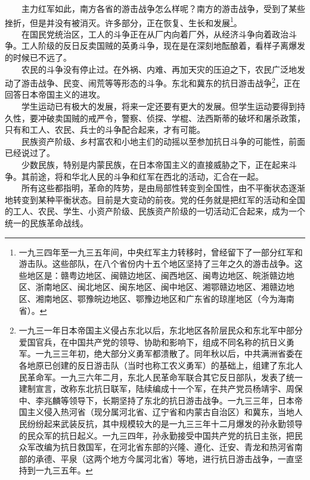 \documentclass[cn,11pt,chinese]{elegantbook}
\begin{document}
　　主力红军如此，南方各省的游击战争怎么样呢？南方的游击战争，受到了某些挫折，但是并没有被消灭。许多部分，正在恢复、生长和发展\footnote[27]{ 一九三四年至一九三五年间，中央红军主力转移时，曾经留下了一部分红军和游击队。这些部队，在八个省份内十五个地区坚持了三年之久的游击战争。这些地区是：赣粤边地区、闽赣边地区、闽西地区、闽粤边地区、皖浙赣边地区、浙南地区、闽北地区、闽东地区、闽中地区、湘鄂赣边地区、湘赣边地区、湘南地区、鄂豫皖边地区、鄂豫边地区和广东省的琼崖地区（今为海南省）。}。\\
　　在国民党统治区，工人的斗争正在从厂内向着厂外，从经济斗争向着政治斗争。工人阶级的反日反卖国贼的英勇斗争，现在是在深刻地酝酿着，看样子离爆发的时候已不远了。\\
　　农民的斗争没有停止过。在外祸、内难、再加天灾的压迫之下，农民广泛地发动了游击战争、民变、闹荒等等形态的斗争。东北和冀东的抗日游击战争\footnote[28]{ 一九三一年日本帝国主义侵占东北以后，东北地区各阶层民众和东北军中部分爱国官兵，在中国共产党的领导、协助和影响下，组成不同名称的抗日义勇军。一九三三年初，绝大部分义勇军都溃散了。同年秋以后，中共满洲省委在各地原已创建的反日游击队（当时也称工农义勇军）的基础上，组建了东北人民革命军。一九三六年二月，东北人民革命军联合其它反日部队，发表了统一建制宣言，改称东北抗日联军，陆续编成十一个军，在共产党员杨靖宇、周保中、李兆麟等领导下，长期坚持了东北的抗日游击战争。一九三三年，日本帝国主义侵入热河省（现分属河北省、辽宁省和内蒙古自治区）和冀东，当地人民纷纷起来武装反抗，其中规模较大的是一九三三年十二月爆发的孙永勤领导的民众军的抗日起义。一九三四年，孙永勤接受中国共产党的抗日主张，把民众军改编为抗日救国军，在河北省东部的兴隆、遵化、迁安、青龙和热河省南部的承德、平泉（这两个地方今属河北省）等地，进行抗日游击战争，一直坚持到一九三五年。}，正在回答日本帝国主义的进攻。\\
　　学生运动已有极大的发展，将来一定还要有更大的发展。但学生运动要得到持久性，要冲破卖国贼的戒严令，警察、侦探、学棍、法西斯蒂的破坏和屠杀政策，只有和工人、农民、兵士的斗争配合起来，才有可能。\\
　　民族资产阶级、乡村富农和小地主们的动摇以至参加抗日斗争的可能性，前面已经说过了。\\
　　少数民族，特别是内蒙民族，在日本帝国主义的直接威胁之下，正在起来斗争。其前途，将和华北人民的斗争和红军在西北的活动，汇合在一起。\\
　　所有这些都指明，革命的阵势，是由局部性转变到全国性，由不平衡状态逐渐地转变到某种平衡状态。目前是大变动的前夜。党的任务就是把红军的活动和全国的工人、农民、学生、小资产阶级、民族资产阶级的一切活动汇合起来，成为一个统一的民族革命战线。\\
\end{document}
